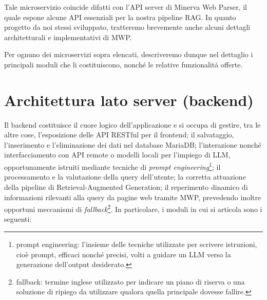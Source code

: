 Tale microservizio coincide difatti con l'API server di Minerva Web Parser, il quale espone alcune API essenziali per la nostra pipeline RAG. In quanto progetto da noi stessi sviluppato, tratteremo brevemente anche alcuni dettagli architetturali e implementativi di MWP. 

Per ognuno dei microservizi sopra elencati, descriveremo dunque nel dettaglio i principali moduli che li costituiscono, nonché le relative funzionalità offerte.

\section{Architettura lato server (backend)}
Il backend costituisce il cuore logico dell'applicazione e si occupa di gestire, tra le altre cose, l'esposizione delle API RESTful per il frontend; il salvataggio, l'inserimento e l'eliminazione dei dati nel database MariaDB; l'interazione nonché interfacciamento con API remote o modelli locali per l'impiego di LLM, opportunamente istruiti mediante tecniche di \textit{prompt engineering}\footnote{prompt engineering: l'insieme delle tecniche utilizzate per scrivere istruzioni, cioè prompt, efficaci nonché precisi, volti a guidare un LLM verso la generazione dell'output desiderato.}; il processamento e la valutazione della query dell'utente; la corretta attuazione della pipeline di Retrieval-Augmented Generation; il reperimento dinamico di informazioni rilevanti alla query da pagine web tramite MWP, prevedendo inoltre opportuni meccanismi di \textit{fallback}\footnote{fallback: termine inglese utilizzato per indicare un piano di riserva o una soluzione di ripiego da utilizzare qualora quella principale dovesse fallire.}. In particolare, i moduli in cui si articola sono i seguenti:

